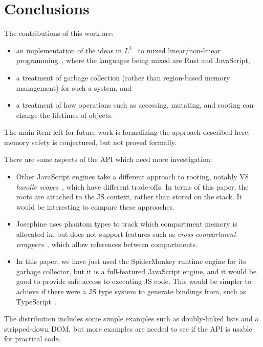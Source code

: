 \section{Conclusions}

The contributions of this work are:
\begin{itemize}

\item an implementation of the ideas in $L^3$~\cite{l3} to mixed
  linear/non-linear programming~\cite{mixed}, where the
  languages being mixed are Rust and JavaScript,

\item a treatment of garbage collection (rather than region-based
  memory management) for such a system, and

\item a treatment of how operations such as accessing, mutating, and
  rooting can change the lifetimes of objects.
  
\end{itemize}
The main item left for future work is formalizing the approach
described here: memory safety is conjectured, but not proved
formally.

There are some aspects of the API which need more investigation:
\begin{itemize}

\item Other JavaScript engines take a different approach to
  rooting, notably V8 \emph{handle scopes}~\cite{v8-embedding},
  which have different trade-offs. In terms of this paper, the
  roots are attached to the JS context, rather than stored
  on the stack. It would be interesting to compare these approaches.

\item Josephine uses phantom types to track which compartment
  memory is allocated in, but does not support features such
  as \emph{cross-compartment wrappers}~\cite{compartments},
  which allow references between compartments.

\item In this paper, we have just used the SpiderMonkey runtime
  engine for its garbage collector, but it is a full-featured
  JavaScript engine, and it would be good to provide safe
  access to executing JS code. This would be simpler to achieve
  if there were a JS type system to generate bindings from,
  such as TypeScript~\cite{typescript}.
  
\end{itemize}
The distribution includes some simple examples such as doubly-linked lists
and a stripped-down DOM, but more examples are needed to see if the API
is usable for practical code.
